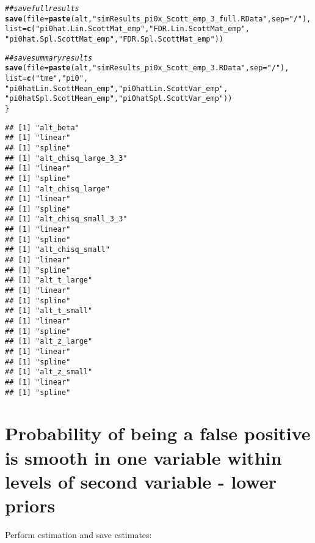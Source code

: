 \documentclass{article}\usepackage[]{graphicx}\usepackage[]{color}
\makeatletter
\newcommand{\hlstr}[1]{\textcolor[rgb]{0.192,0.494,0.8}{#1}}%
\newcommand{\hlcom}[1]{\textcolor[rgb]{0.678,0.584,0.686}{\textit{#1}}}%
\newcommand{\hlstd}[1]{\textcolor[rgb]{0.345,0.345,0.345}{#1}}%
\newcommand{\hlkwc}[1]{\textcolor[rgb]{0.333,0.667,0.333}{#1}}%
\newcommand{\hlkwd}[1]{\textcolor[rgb]{0.737,0.353,0.396}{\textbf{#1}}}%
\newenvironment{kframe}{%
 \def\at@end@of@kframe{}%
 \ifinner\ifhmode%
  \def\at@end@of@kframe{\end{minipage}}%
  \begin{minipage}{\columnwidth}%
 \fi\fi%
 \def\FrameCommand##1{\hskip\@totalleftmargin \hskip-\fboxsep
 \colorbox{shadecolor}{##1}\hskip-\fboxsep
     \hskip-\linewidth \hskip-\@totalleftmargin \hskip\columnwidth}%
 \MakeFramed {\advance\hsize-\width
   \@totalleftmargin\z@ \linewidth\hsize
   \@setminipage}}%
 {\par\unskip\endMakeFramed%
 \at@end@of@kframe}
\newenvironment{knitrout}{}{} %
\makeatother
\begin{document}
\begin{knitrout}
\begin{kframe}
\begin{alltt}
  \hlcom{##save full results}
  \hlkwd{save}\hlstd{(}\hlkwc{file}\hlstd{=}\hlkwd{paste}\hlstd{(alt,}\hlstr{"simResults_pi0x_Scott_emp_3_full.RData"}\hlstd{,}\hlkwc{sep}\hlstd{=}\hlstr{"/"}\hlstd{),}
       \hlkwc{list}\hlstd{=}\hlkwd{c}\hlstd{(}\hlstr{"pi0hat.Lin.ScottMat_emp"}\hlstd{,} \hlstr{"FDR.Lin.ScottMat_emp"}\hlstd{,}
              \hlstr{"pi0hat.Spl.ScottMat_emp"}\hlstd{,} \hlstr{"FDR.Spl.ScottMat_emp"}\hlstd{))}

  \hlcom{##save summary results}
  \hlkwd{save}\hlstd{(}\hlkwc{file}\hlstd{=}\hlkwd{paste}\hlstd{(alt,}\hlstr{"simResults_pi0x_Scott_emp_3.RData"}\hlstd{,}\hlkwc{sep}\hlstd{=}\hlstr{"/"}\hlstd{),}
       \hlkwc{list}\hlstd{=}\hlkwd{c}\hlstd{(}\hlstr{"tme"}\hlstd{,} \hlstr{"pi0"}\hlstd{,}
              \hlstr{"pi0hatLin.ScottMean_emp"}\hlstd{,} \hlstr{"pi0hatLin.ScottVar_emp"}\hlstd{,}
              \hlstr{"pi0hatSpl.ScottMean_emp"}\hlstd{,} \hlstr{"pi0hatSpl.ScottVar_emp"}\hlstd{))}
\hlstd{\}}
\end{alltt}
\begin{verbatim}
## [1] "alt_beta"
## [1] "linear"
## [1] "spline"
## [1] "alt_chisq_large_3_3"
## [1] "linear"
## [1] "spline"
## [1] "alt_chisq_large"
## [1] "linear"
## [1] "spline"
## [1] "alt_chisq_small_3_3"
## [1] "linear"
## [1] "spline"
## [1] "alt_chisq_small"
## [1] "linear"
## [1] "spline"
## [1] "alt_t_large"
## [1] "linear"
## [1] "spline"
## [1] "alt_t_small"
## [1] "linear"
## [1] "spline"
## [1] "alt_z_large"
## [1] "linear"
## [1] "spline"
## [1] "alt_z_small"
## [1] "linear"
## [1] "spline"
\end{verbatim}
\end{kframe}
\end{knitrout}

\section{Probability of being a false positive is smooth in one variable within levels of second variable - lower priors}

Perform estimation and save estimates:
\end{document}
